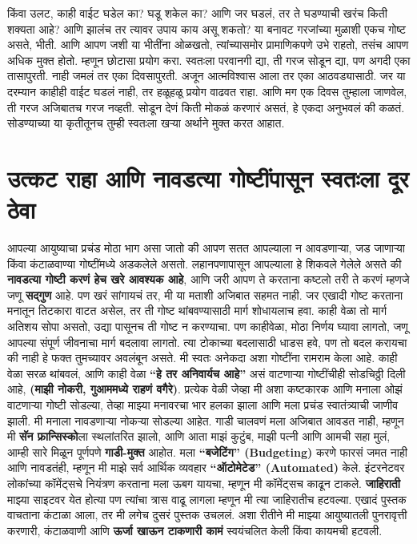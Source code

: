  किंवा उलट,  काही वाईट घडेल का? घडू शकेल का? आणि जर घडलं, तर ते घडण्याची खरंच किती शक्यता आहे? आणि झालंच तर त्यावर उपाय काय असू शकतो?
या बनावट गरजांच्या मुळाशी एकच गोष्ट असते,  भीती. आणि आपण जशी या भीतींना ओळखतो, त्यांच्यासमोर प्रामाणिकपणे उभे राहतो, तसंच आपण अधिक मुक्त होतो.
 म्हणून छोटासा प्रयोग करा. स्वतःला परवानगी द्या,  ती गरज सोडून द्या, पण अगदी एका तासापुरती. नाही जमलं तर एका दिवसापुरती. अजून आत्मविश्वास आला तर एका आठवड्यासाठी. जर या दरम्यान काहीही वाईट घडलं नाही, तर हळूहळू प्रयोग वाढवत राहा. आणि मग एक दिवस तुम्हाला जाणवेल,  ती गरज अजिबातच गरज नव्हती.
सोडून देणं किती मोकळं करणारं असतं, हे एकदा अनुभवलं की कळतं. सोडण्याच्या या कृतीतूनच तुम्ही स्वतःला खऱ्या अर्थाने मुक्त करत आहात.
 
 \chapter{उत्कट राहा आणि नावडत्या गोष्टींपासून स्वतःला दूर ठेवा}
आपल्या आयुष्याचा प्रचंड मोठा भाग असा जातो की आपण सतत आपल्याला न आवडणाऱ्या, जड जाणाऱ्या किंवा कंटाळवाण्या गोष्टींमध्ये अडकलेले असतो. लहानपणापासून आपल्याला हे शिकवले गेलेले असते की \textbf{नावडत्या गोष्टी करणं हेच खरे आवश्यक आहे}, आणि जरी आपण ते करताना कष्टलो तरी ते करणं म्हणजे जणू \textbf{सद्गुण} आहे. पण खरं सांगायचं तर, मी या मताशी अजिबात सहमत नाही.
जर एखादी गोष्ट करताना मनातून तिटकारा वाटत असेल, तर ती गोष्ट थांबवण्यासाठी मार्ग शोधायलाच हवा. काही वेळा तो मार्ग अतिशय सोपा असतो, उद्या पासूनच ती गोष्ट न करण्याचा. पण काहीवेळा, मोठा निर्णय घ्यावा लागतो, जणू आपल्या संपूर्ण जीवनाचा मार्ग बदलावा लागतो. त्या टोकाच्या बदलासाठी धाडस हवे, पण तो बदल करायचा की नाही हे फक्त तुमच्यावर अवलंबून असते.
मी स्वतः अनेकदा अशा गोष्टींना रामराम केला आहे. काही वेळा सरळ थांबवलं, आणि काही वेळा \textbf{``हे तर अनिवार्यच आहे''} असं वाटणाऱ्या गोष्टींचीही सोडचिठ्ठी दिली आहे, \textbf{(माझी नोकरी, गुआममध्ये राहणं वगैरे)}. प्रत्येक वेळी जेव्हा मी अशा कष्टकारक आणि मनाला ओझं वाटणाऱ्या गोष्टी सोडल्या, तेव्हा माझ्या मनावरचा भार हलका झाला आणि मला प्रचंड स्वातंत्र्याची जाणीव झाली.
मी मनाला नावडणाऱ्या नोकऱ्या सोडल्या आहेत. गाडी चालवणं मला अजिबात आवडत नाही, म्हणून मी \textbf{सॅन फ्रान्सिस्को}ला स्थलांतरित झालो, आणि आता माझं कुटुंब, माझी पत्नी आणि आमची सहा मुलं, आम्ही सारे मिळून पूर्णपणे \textbf{गाडी-मुक्त} आहोत. मला \textbf{``बजेटिंग'' (Budgeting)} करणे फारसं जमत नाही आणि नावडतंही, म्हणून मी माझे सर्व आर्थिक व्यवहार \textbf{``ऑटोमेटेड'' (Automated)} केले. इंटरनेटवर लोकांच्या कॉमेंट्सचे नियंत्रण करताना मला ऊबग यायचा, म्हणून मी कॉमेंट्सच काढून टाकले. \textbf{जाहिराती} माझ्या साइटवर येत होत्या पण त्यांचा त्रास वाढू लागला म्हणून मी त्या जाहिरातीच हटवल्या. एखादं पुस्तक वाचताना कंटाळा आला, तर मी लगेच दुसरं पुस्तक उचललं. अशा रीतीने मी माझ्या आयुष्यातली पुनरावृत्ती करणारी, कंटाळवाणी आणि \textbf{ऊर्जा खाऊन टाकणारी कामं} स्वयंचलित केली किंवा कायमची हटवली.

